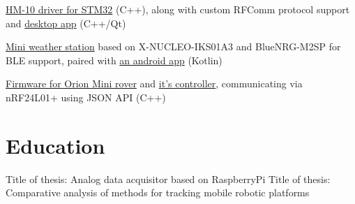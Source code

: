 \documentclass[a4paper]{comcv}
\begin{document}
\begin{tightlist}
    \item \href{https://github.com/SteelPh0enix/STM32_HM10_Driver}{HM-10 driver for STM32} (C++), along with custom RFComm protocol support and \href{https://github.com/SteelPh0enix/BLERFCommClient}{desktop app} (C++/Qt)
    \item \href{https://github.com/SteelPh0enix/BLEWeatherStation}{Mini weather station} based on X-NUCLEO-IKS01A3 and BlueNRG-M2SP for BLE support, paired with \href{https://github.com/SteelPh0enix/WeatherStationAndroidApp}{an android app} (Kotlin)
    \item \href{https://github.com/SteelPh0enix/Orion-Mini-Rover}{Firmware for Orion Mini rover} and \href{https://github.com/SteelPh0enix/Orion-Mini-Controller}{it's controller}, communicating via nRF24L01+ using JSON API (C++)
\end{tightlist}

\vspace{\topsep}

\section{Education}

\vspace{\topsep}
Title of thesis: Analog data acquisitor based on RaspberryPi
\vspace{\topsep}
Title of thesis: Comparative analysis of methods for tracking mobile robotic platforms

\vspace{\topsep}
\end{document}
